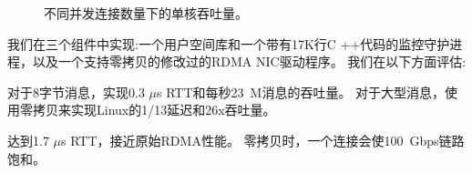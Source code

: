 \begin{figure}[t!]
		\centering
		
		\caption{不同并发连接数量下的单核吞吐量。}
		\label{socksdirect:fig:eval-connnum-tput}
\end{figure}


我们在三个组件中实现\sys :一个用户空间库\libipc {}和一个带有17K行C ++代码的监控守护进程，以及一个支持零拷贝的修改过的RDMA NIC驱动程序。 我们在以下方面评估\sys :

对于8字节消息，\sys 实现0.3 $\mu$s RTT和每秒23~M消息的吞吐量。 对于大型消息，\sys 使用零拷贝来实现Linux的1/13延迟和26x吞吐量。

\sys 达到1.7 $\mu$s RTT，接近原始RDMA性能。
零拷贝时，一个连接会使100~Gbps链路饱和。

